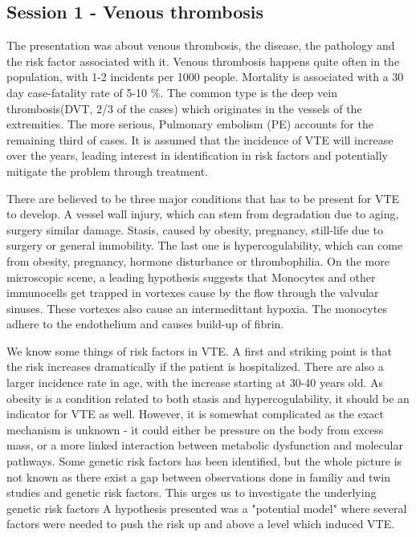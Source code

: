 \documentclass[12p]{article}
\begin{document}
\subsection*{Session 1 - Venous thrombosis}

The presentation was about venous thrombosis, the disease, the pathology and the risk factor associated with it.
Venous thrombosis happens quite often in the population, with 1-2 incidents per 1000 people.
Mortality is associated with a 30 day case-fatality rate of 5-10 \%.
The common type is the deep vein thrombosis(DVT, 2/3 of the cases) which originates in the vessels of the extremities.
The more serious, Pulmonary embolism (PE) accounts for the remaining third of cases.
It is assumed that the incidence of VTE will increase over the years, leading interest in identification in risk factors and potentially mitigate the problem through treatment.

There are believed to be three major conditions that has to be present for VTE to develop.
A vessel wall injury, which can stem from degradation due to aging, surgery similar damage.
Stasis, caused by obesity, pregnancy, still-life due to surgery or general immobility.
The last one is hypercogulability, which can come from obesity, pregnancy, hormone disturbance or thrombophilia.
On the more microscopic scene, a leading hypothesis suggests that Monocytes and other immunocells get trapped in vortexes cause by the flow through the valvular sinuses.
These vortexes also cause an intermedittant hypoxia.
The monocytes adhere to the endothelium and causes build-up of fibrin.

We know some things of risk factors in VTE.
A first and striking point is that the risk increases dramatically if the patient is hospitalized.
There are also a larger incidence rate in age, with the increase starting at 30-40 years old.
As obesity is a condition related to both stasis and hypercogulability, it should be an indicator for VTE as well.
However, it is somewhat complicated as the exact mechanism is unknown - it could either be pressure on the body from excess mass, or a more linked interaction between metabolic dysfunction and molecular pathways.
Some genetic risk factors has been identified, but the whole picture is not known as there exist a gap between observations done in familiy and twin studies and genetic risk factors.
This urges us to investigate the underlying genetic risk factors
A hypothesis presented was a "potential model" where several factors were needed to push the risk up and above a level which induced VTE.
\end{document}
